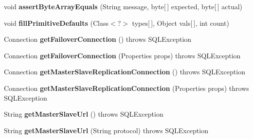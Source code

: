 \begin{DoxyCompactItemize}
\mbox{\label{classtestsuite_1_1_base_test_case_a64c93499839212c311d50823ef3f4edc}} 
void {\bfseries assert\+Byte\+Array\+Equals} (String message, byte\mbox{[}$\,$\mbox{]} expected, byte\mbox{[}$\,$\mbox{]} actual)
\item 
\mbox{\label{classtestsuite_1_1_base_test_case_a0a24b304ec6c8bcc8ffa37528d1c0800}} 
void {\bfseries fill\+Primitive\+Defaults} (Class$<$?$>$ types\mbox{[}$\,$\mbox{]}, Object vals\mbox{[}$\,$\mbox{]}, int count)
\item 
\mbox{\label{classtestsuite_1_1_base_test_case_aa0bd46e11f461b964afb1a93a6e5aa15}} 
Connection {\bfseries get\+Failover\+Connection} ()  throws S\+Q\+L\+Exception 
\item 
\mbox{\label{classtestsuite_1_1_base_test_case_a7b89fc31036d3e6e4903f21c98477de4}} 
Connection {\bfseries get\+Failover\+Connection} (Properties props)  throws S\+Q\+L\+Exception 
\item 
\mbox{\label{classtestsuite_1_1_base_test_case_a3ca1d1435694c5409c44d10e68800ccd}} 
Connection {\bfseries get\+Master\+Slave\+Replication\+Connection} ()  throws S\+Q\+L\+Exception 
\item 
\mbox{\label{classtestsuite_1_1_base_test_case_aafbc4ce5f24d35545475dfe8ccd213f1}} 
Connection {\bfseries get\+Master\+Slave\+Replication\+Connection} (Properties props)  throws S\+Q\+L\+Exception 
\item 
\mbox{\label{classtestsuite_1_1_base_test_case_ae368e9f56d2795da57e928cba4528ebb}} 
String {\bfseries get\+Master\+Slave\+Url} ()  throws S\+Q\+L\+Exception 
\item 
\mbox{\label{classtestsuite_1_1_base_test_case_a1086920faaf5ad5271dd4cbf1cc92b75}} 
String {\bfseries get\+Master\+Slave\+Url} (String protocol)  throws S\+Q\+L\+Exception 
\item 
\mbox{\label{classtestsuite_1_1_base_test_case_ad6cc6fb4e11a39397721138337a9a099}} 

\end{DoxyCompactItemize}
